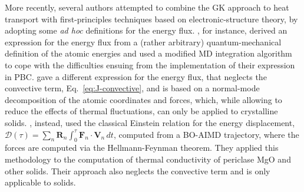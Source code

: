 More recently, several authors attempted to combine the GK approach to heat transport with first-principles techniques based on electronic-structure theory, by adopting some \emph{ad hoc} definitions for the energy flux. \citet{Kang2017}, for instance, derived an expression for the energy flux from a (rather arbitrary) quantum-mechanical definition of the atomic energies and used a modified MD integration algorithm to cope with the difficulties ensuing from the implementation of their expression in PBC. 
\citet{Carbogno:2017gc} gave a different expression for the energy flux, that neglects the convective term, Eq.~\eqref{eq:J-convective}, and is based on a normal-mode decomposition of the atomic coordinates and forces, which, while allowing to reduce the effects of thermal fluctuations, can only be applied to crystalline solids.
\citet{English2017}, instead, used the classical Einstein relation for the energy displacement, $\mathcal{D}(\tau) = \sum_n \mathbf{R}_n \int_0^\tau \mathbf{F}_n \cdot \mathbf{V}_n \, dt$, computed from a BO-AIMD trajectory, where the forces are computed via the Hellmann-Feynman theorem. They applied this methodology to the computation of thermal conductivity of periclase MgO \cite{Tse2018} and other solids. Their approach also neglects the convective term and is only applicable to solids.



